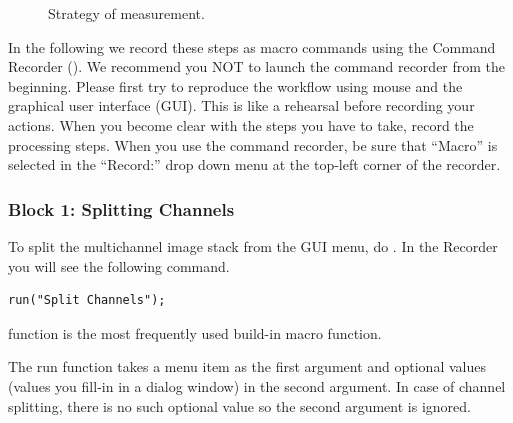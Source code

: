 \begin{figure}[!ht]
 \quad
 \caption{Strategy of measurement.}
 \label{fig:nucsegProc}
\end{figure}


In the following we record these steps as macro commands using the Command Recorder (). We recommend you NOT to launch the command recorder from the beginning. Please first try to reproduce the workflow using mouse and the graphical user interface (GUI). This is like a rehearsal before recording your actions. When you become clear with the steps you have to take, record the processing steps. When you use the command recorder, be sure that ``Macro'' is selected in the ``Record:'' drop down menu at the top-left corner of the recorder.

\subsubsection{Block 1: Splitting Channels}

To split the multichannel image stack from the GUI menu, do . In the Recorder you will see the following command. 
\begin{lstlisting}[numbers=none]
run("Split Channels");
\end{lstlisting}

 function is the most frequently used build-in macro function. 


The run function takes a menu item as the first argument and optional values (values you fill-in in a dialog window) in the second argument. In case of channel splitting, there is no such optional value so the second argument is ignored. 

